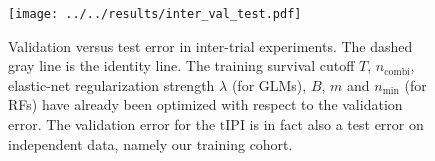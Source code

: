 \begin{figure}
    \centering
    \texttt{[image: ../../results/inter\_val\_test.pdf]}
    \caption{Validation versus test error in inter-trial experiments. The dashed gray line is the 
        identity line. The training survival cutoff $T$, 
        $n_\text{combi}$, elastic-net regularization strength $\lambda$ (for GLMs), 
        $B$, $m$ and $n_\text{min}$ (for RFs) have already been optimized with respect to the 
        validation error. The validation error for the $\text{tIPI}$ is in 
        fact also a test error on independent data, namely our training cohort.}
    \label{fig:inter-val-test}
\end{figure}